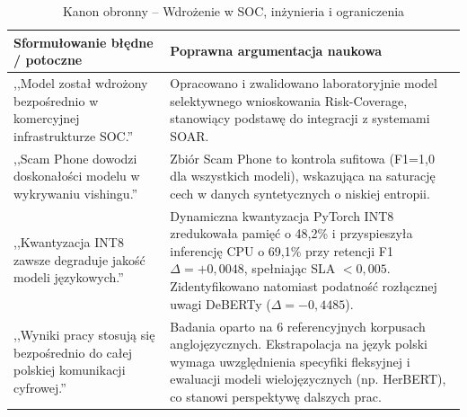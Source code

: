 \documentclass[12pt,a4paper,twoside]{report}
\begin{document}
\begin{table}[H]\centering
\caption{Kanon obronny -- Wdrożenie w SOC, inżynieria i ograniczenia}\label{tab:banned_eng}
\footnotesize
\begin{tabularx}{\textwidth}{X X}\toprule
\textbf{Sformułowanie błędne / potoczne} & \textbf{Poprawna argumentacja naukowa} \\\midrule
,,Model został wdrożony bezpośrednio w komercyjnej infrastrukturze SOC.'' &
  Opracowano i zwalidowano laboratoryjnie model selektywnego wnioskowania Risk-Coverage, stanowiący podstawę do integracji z systemami SOAR. \\\midrule
,,Scam Phone dowodzi doskonałości modelu w wykrywaniu vishingu.'' &
  Zbiór Scam Phone to kontrola sufitowa (F1=1,0 dla wszystkich modeli), wskazująca na saturację cech w danych syntetycznych o niskiej entropii. \\\midrule
,,Kwantyzacja INT8 zawsze degraduje jakość modeli językowych.'' &
  Dynamiczna kwantyzacja PyTorch INT8 zredukowała pamięć o 48,2\% i przyspieszyła inferencję CPU o 69,1\% przy retencji F1 $\Delta = +0,0048$, spełniając SLA $<0,005$. Zidentyfikowano natomiast podatność rozłącznej uwagi DeBERTy ($\Delta = -0,4485$). \\\midrule
,,Wyniki pracy stosują się bezpośrednio do całej polskiej komunikacji cyfrowej.'' &
  Badania oparto na 6 referencyjnych korpusach anglojęzycznych. Ekstrapolacja na język polski wymaga uwzględnienia specyfiki fleksyjnej i ewaluacji modeli wielojęzycznych (np. HerBERT), co stanowi perspektywę dalszych prac. \\
\bottomrule\end{tabularx}
\end{table}
\end{document}
